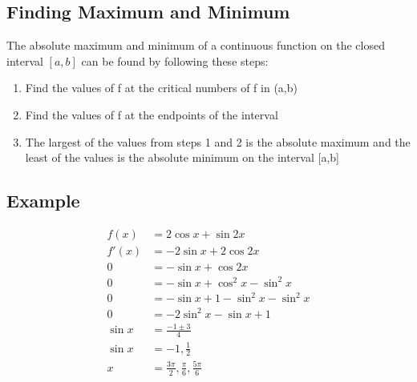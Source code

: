 \documentclass{article}
\theoremstyle{mytheoremstyle}
\theoremstyle{mytheoremstyle}
\theoremstyle{myproblemstyle}
\begin{document}
    \subsection*{Finding Maximum and Minimum}
    The absolute maximum and minimum of a continuous function on the closed
    interval $[a,b]$ can be found by following these steps:

    \begin{enumerate}
        \item Find the values of f at the critical numbers of f in (a,b)
        \item Find the values of f at the endpoints of the interval
        \item The largest of the values from steps 1 and 2 is the absolute
            maximum and the least of the values is the absolute minimum on the
            interval [a,b]
    \end{enumerate}

    \subsection*{Example}
    \begin{align*}
        f(x)  &= 2\cos x + \sin 2x \\
        f'(x) &= -2\sin x + 2\cos2x \\
        0 &= -\sin x + \cos 2x \\
        0 &= -\sin x + \cos^2 x - \sin^2 x \\
        0 &= -\sin x + 1 - \sin^2 x - \sin^2 x \\
        0 &= -2\sin^2 x -\sin x + 1 \\
        \sin x &= \frac{-1 \pm 3}{4} \\
        \sin x &= -1, \frac{1}{2} \\
        x &= \frac{3\pi}{2}, \frac{\pi}{6}, \frac{5\pi}{6}
    \end{align*}
\end{document}
